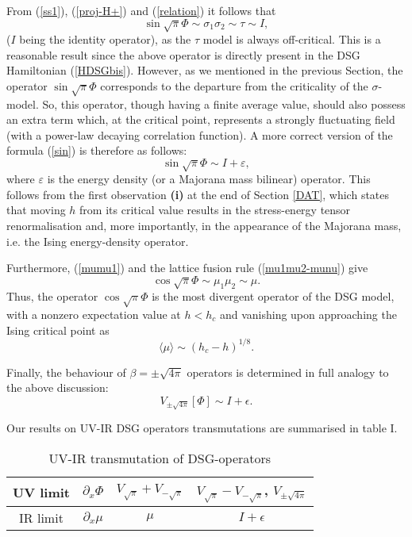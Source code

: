 From (\ref{ss1}), (\ref{proj-H+}) and (\ref{relation}) it follows
that
\begin{equation}
\sin \sqrt{\pi} \Phi \sim \sigma_1 \sigma_2 \sim \tau \sim I,
\label{sin}
\end{equation}
($I$ being the identity operator), as the $\tau$ model
is always off-critical. 
This is a reasonable result
since the above operator is directly present in the
DSG Hamiltonian (\ref{HDSGbis}).
However, as we mentioned in the previous Section,
the operator $\sin\sqrt{\pi}\Phi$ corresponds to
the departure from the criticality of the
$\sigma$-model.
So, this operator, though having a finite average
value, should also possess an extra term
which, at the critical point, represents a strongly
fluctuating field (with a power-law decaying correlation function).
A more correct version of the formula (\ref{sin})
is therefore as follows:
\begin{equation}
\sin\sqrt{\pi}\Phi \sim I+ \varepsilon,
\label{sincor}
\end{equation}
where $\varepsilon$ is the energy density
(or a Majorana mass bilinear) operator.
This follows from the first observation {\bf (i)}
at the end of Section \ref{DAT}, which states that moving $h$
from its critical value
results in the stress-energy
tensor renormalisation and, more
importantly, in the appearance of the
Majorana mass, i.e. the Ising energy-density operator.

Furthermore, (\ref{mumu1}) and the
lattice fusion rule (\ref{mu1mu2-munu}) give
\begin{equation}
\cos\sqrt{\pi}\Phi\sim\mu_1\mu_2\sim\mu.
\label{cos}
\end{equation}
Thus, the operator $\cos\sqrt{\pi}\Phi$ is the most divergent operator
of the DSG model, with a nonzero expectation value at $h < h_c$ and
vanishing upon approaching the Ising critical point as
\begin{equation}
\langle \mu \rangle \sim \left( h_c - h \right)^{1/8}.
\label{av-mu-crit}
\end{equation}

Finally, the behaviour of $\beta=\pm \sqrt{4\pi}$
operators
is determined in full analogy to the above discussion:
\begin{equation}
V_{\pm\sqrt{4\pi}}[\Phi]\sim I+\epsilon.
\label{4pi}
\end{equation}

Our results on UV-IR DSG operators transmutations are
summarised in table I.

\begin{table}
\caption{UV-IR transmutation of DSG-operators}
\begin{center}
\begin{tabular}{|c|c|c|c|}
\hline UV limit & $\partial_x\Phi$ &
$V_{\sqrt{\pi}}+V_{-\sqrt{\pi}}$
& $V_{\sqrt{\pi}}-V_{-\sqrt{\pi}}$,
$V_{\pm\sqrt{4\pi}}$ \\
\hline IR limit & $\partial_x\mu$ & $\mu$ & $I+\epsilon$\\
\hline
\end{tabular}
\end{center}
\end{table}

